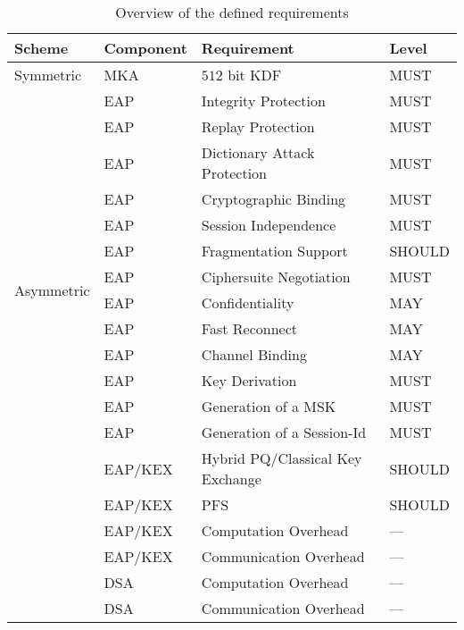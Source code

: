 \begin{table}[ht]
    \centering
    \caption{Overview of the defined requirements}
    \begin{tabular}{llll}
        \hline
        \textbf{Scheme} & \textbf{Component} & \textbf{Requirement} & \textbf{Level} \\
        \hline
        \multirow{1}{*}{Symmetric} 
            & MKA & \(512\) bit \ac{KDF} & MUST \\
            \hline
        \multirow{14}{*}{Asymmetric} 
            & \ac{EAP} & Integrity Protection & MUST\\
            & \ac{EAP} & Replay Protection & MUST \\
            & \ac{EAP} & Dictionary Attack Protection & MUST \\
            & \ac{EAP} & Cryptographic Binding & MUST \\
            & \ac{EAP} & Session Independence & MUST\\
            & \ac{EAP} & Fragmentation Support & SHOULD \\
            & \ac{EAP} & Ciphersuite Negotiation & MUST \\
            & \ac{EAP} & Confidentiality & MAY \\
            & \ac{EAP} & Fast Reconnect & MAY\\
            & \ac{EAP} & Channel Binding & MAY \\
            & \ac{EAP} & Key Derivation & MUST \\
            & \ac{EAP} & Generation of a \ac{MSK} & MUST \\
            & \ac{EAP} & Generation of a Session-Id & MUST \\
            & EAP/KEX & Hybrid \ac{PQ}/Classical Key Exchange & SHOULD \\
            & EAP/KEX & \ac{PFS} & SHOULD \\
            & EAP/KEX & Computation Overhead & --- \\
            & EAP/KEX & Communication Overhead & --- \\
            & DSA & Computation Overhead & --- \\
            & DSA & Communication Overhead & --- \\
        \hline
    \end{tabular}
    \label{table:requirements}
\end{table}


